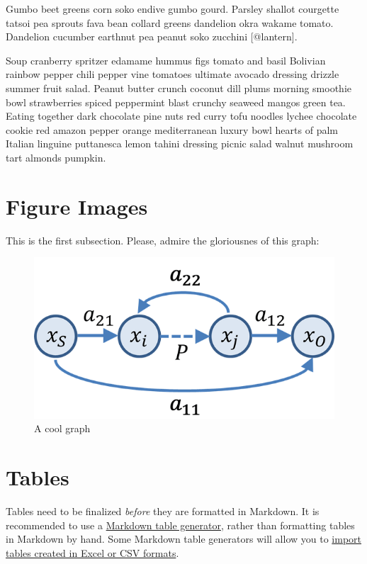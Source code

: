 \documentclass{book}
\begin{document}
Gumbo beet greens corn soko endive gumbo gourd. Parsley shallot courgette
tatsoi pea sprouts fava bean collard greens dandelion okra wakame tomato.
Dandelion cucumber earthnut pea peanut soko zucchini {[}@lantern{]}.

Soup cranberry spritzer edamame hummus figs tomato and basil Bolivian rainbow
pepper chili pepper vine tomatoes ultimate avocado dressing drizzle summer
fruit salad. Peanut butter crunch coconut dill plums morning smoothie bowl
strawberries spiced peppermint blast crunchy seaweed mangos green tea. Eating
together dark chocolate pine nuts red curry tofu noodles lychee chocolate
cookie red amazon pepper orange mediterranean luxury bowl hearts of palm
Italian linguine puttanesca lemon tahini dressing picnic salad walnut mushroom
tart almonds pumpkin.

\hypertarget{figure-images}{%
\section{Figure Images}\label{figure-images}}

This is the first subsection. Please, admire the gloriousnes of this graph:

\begin{figure}
\hypertarget{fig:graph}{%
\centering
\includegraphics{graph.png}
\caption{A cool graph}\label{fig:graph}
}
\end{figure}

\hypertarget{tables}{%
\section{Tables}\label{tables}}

Tables need to be finalized \emph{before} they are formatted in Markdown. It
is recommended to use a
\href{https://www.tablesgenerator.com/markdown_tables}{Markdown table
generator}, rather than formatting tables in Markdown by hand. Some Markdown
table generators will allow you to
\href{https://jakebathman.github.io/Markdown-Table-Generator/}{import tables
created in Excel or CSV formats}.
\end{document}
